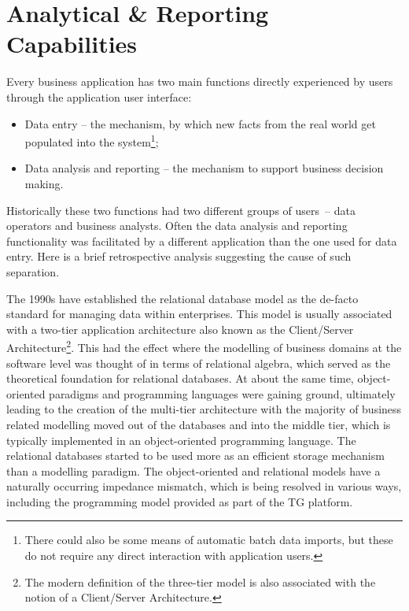\section{Analytical \& Reporting Capabilities}\label{sec:06}
  Every business application has two main functions directly experienced by users through the application user interface:
  \begin{itemize}
   \item Data entry -- the mechanism, by which new facts from the real world get populated into the system\footnote{There could also be some means of automatic batch data imports, but these do not require any direct interaction with application users.};
   \item Data analysis and reporting -- the mechanism to support business decision making.
  \end{itemize}
  Historically these two functions had two different groups of users~-- data operators and business analysts.
  Often the data analysis and reporting functionality was facilitated by a different application than the one used for data entry.
  Here is a brief retrospective analysis suggesting the cause of such separation.
  
  The 1990s have established the relational database model as the de-facto standard for managing data within enterprises.
  This model is usually associated with a two-tier application architecture also known as the Client/Server Architecture\footnote{The modern definition of the three-tier model is also associated with the notion of a Client/Server Architecture.}.
  This had the effect where the modelling of business domains at the software level was thought of in terms of relational algebra, which served as the theoretical foundation for relational databases.
  At about the same time, object-oriented paradigms and programming languages were gaining ground, ultimately leading to the creation of the multi-tier architecture with the majority of business related modelling moved out of the databases and into the middle tier, which is typically implemented in an object-oriented programming language.
  The relational databases started to be used more as an efficient storage mechanism than a modelling paradigm.
  The object-oriented and relational models have a naturally occurring impedance mismatch, which is being resolved in various ways, including the programming model provided as part of the TG platform.
  

